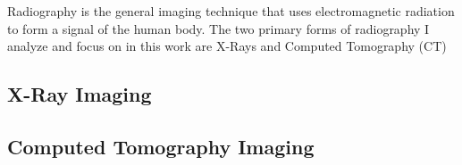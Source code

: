 Radiography is the general imaging technique that uses electromagnetic radiation to form a signal of the human body. The two primary forms of radiography I analyze and focus on in this work are X-Rays and Computed Tomography (CT)

\subsection{X-Ray Imaging}

\subsection{Computed Tomography Imaging}